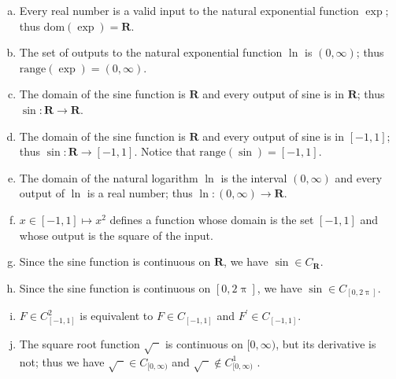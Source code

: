 \documentclass[12pt]{article}
\newenvironment{alphalist}{
  \begin{enumerate}[(a)]
    \addtolength{\itemsep}{-0.5\itemsep}}
  {\end{enumerate}}
\newcommand{\dom}{\mathrm{dom}}
\newcommand{\range}{\mathrm{range}}
\newcommand{\reals}{\mathbf{R}}
\begin{document}
\begin{alphalist}
\item Every real number is a valid input to the natural exponential function \(\exp\); thus \(\dom(\exp) = \reals\).

\item The set of outputs to the  natural exponential function $\ln$ is \((0,\infty) \); thus \(\range(\exp) = (0,\infty)\).

\item The domain of the sine function is $\reals$ and every output of sine is in $\reals$; thus $\sin : \reals \to \reals$.

\item The domain of the sine function is $\reals$ and every output of sine is in $[-1,1]$; thus $\sin : \reals \to [-1,1]$.
Notice that $\range(\sin) = [-1,1]$.

\item The domain of the natural logarithm $\ln$ is the interval $(0,\infty)$ and every output of \(\ln\) is a real number; thus
$\ln : (0,\infty) \to \reals$.




\item $x \in [-1,1] \mapsto x^2$ defines a function whose domain is the set $[-1,1]$ and whose output is the square of
the input. 

\item Since the sine function is continuous on \(\reals\), we have $\sin \in C_\reals$.


\item Since the sine function is continuous on \([0,2 \uppi]\), we have \(\sin \in C_{[0,2 \uppi]}\).

\item $F \in C_{[-1,1]}^2$ is equivalent to  $F \in C_{[-1,1]}$ and $F^\prime \in C_{[-1,1]}$.

\item The square root function \(\sqrt{\phantom{x}}\) is continuous on \([0,\infty)\), but its derivative is not; thus we have
\(\sqrt{\phantom{x}} \in C_{[0,\infty)} \) and  \(\sqrt{\phantom{x}} \notin C_{[0,\infty)}^1 \) .
\end{alphalist}
\end{document}
